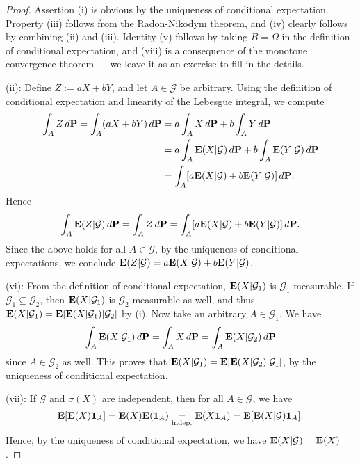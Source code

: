 \begin{proof}
    Assertion (i) is obvious by the uniqueness of conditional expectation. Property (iii) follows from the Radon-Nikodym theorem, and (iv) clearly follows by combining (ii) and (iii). Identity (v) follows by taking $B=\Omega$ in the definition of conditional expectation, and (viii) is a consequence of the monotone convergence theorem --- we leave it as an exercise to fill in the details.

    (ii): Define $Z:= aX+bY$, and let $A\in\mathcal{G}$ be arbitrary. Using the definition of conditional expectation and linearity of the Lebesgue integral, we compute
    \begin{align*}
        \int_A Z\,d\mathbf{P} = \int_A (aX+bY)\,d\mathbf{P} &= a\int_A X\,d\mathbf{P} + b\int_A Y\,d\mathbf{P} \\
        &= a\int_A \mathbf{E}(X|\mathcal{G})\,d\mathbf{P} + b\int_A \mathbf{E}(Y|\mathcal{G})\,d\mathbf{P} \\
        &= \int_A [a\mathbf{E}(X|\mathcal{G}) + b\mathbf{E}(Y|\mathcal{G})]\,d\mathbf{P}.
    \end{align*}
    Hence
    \begin{equation*}
        \int_A \mathbf{E}(Z|\mathcal{G})\,d\mathbf{P} = \int_A Z\,d\mathbf{P} = \int_A [a\mathbf{E}(X|\mathcal{G}) + b\mathbf{E}(Y|\mathcal{G})]\,d\mathbf{P}.
    \end{equation*}
    Since the above holds for all $A\in\mathcal{G}$, by the uniqueness of conditional expectations, we conclude $\mathbf{E}(Z|\mathcal{G}) = a\mathbf{E}(X|\mathcal{G}) + b\mathbf{E}(Y|\mathcal{G})$.

    (vi): From the definition of conditional expectation, $\mathbf{E}(X|\mathcal{G}_1)$ is $\mathcal{G}_1$-measurable. If $\mathcal{G}_1\subseteq \mathcal{G}_2$, then $\mathbf{E}(X|\mathcal{G}_1)$ is $\mathcal{G}_2$-measurable as well, and thus $\mathbf{E}(X|\mathcal{G}_1) = \mathbf{E}[\mathbf{E}(X|\mathcal{G}_1)|\mathcal{G}_2]$ by (i). Now take an arbitrary $A\in\mathcal{G}_1$. We have
    \begin{equation*}
        \int_A \mathbf{E}(X|\mathcal{G}_1)\,d\mathbf{P} = \int_A X\,d\mathbf{P} = \int_A \mathbf{E}(X|\mathcal{G}_2)\,d\mathbf{P}
    \end{equation*}
    since $A\in\mathcal{G}_2$ as well. This proves that $\mathbf{E}(X|\mathcal{G}_1) = \mathbf{E}[\mathbf{E}(X|\mathcal{G}_2)|\mathcal{G}_1]$, by the uniqueness of conditional expectation.

    (vii): If $\mathcal{G}$ and $\sigma(X)$ are independent, then for all $A\in\mathcal{G}$, we have
    \begin{equation*}
        \mathbf{E}[\mathbf{E}(X)\mathbf{1}_A] = \mathbf{E}(X)\mathbf{E}(\mathbf{1}_A) \underset{\text{indep.}}{=} \mathbf{E}(X\mathbf{1}_A) = \mathbf{E}[\mathbf{E}(X|\mathcal{G})\mathbf{1}_A].
    \end{equation*}
    Hence, by the uniqueness of conditional expectation, we have $\mathbf{E}(X|\mathcal{G})=\mathbf{E}(X)$.
\end{proof}

